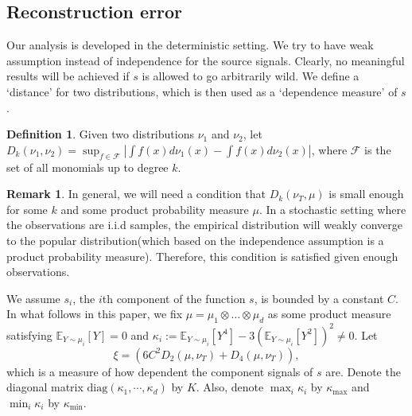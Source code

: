 \documentclass[twoside]{article}
\newcommand{\E}{\mathbb{E}}
\theoremstyle{definition}
\newtheorem{definition}[lemma]{Definition}
\newtheorem{remark}[lemma]{Remark}
\begin{document}
\subsection{Reconstruction error}
\label{subsec:errorHK}
Our analysis is developed in the deterministic setting.
We try to have weak assumption instead of independence for the source signals. 
Clearly, no meaningful results will be achieved if $s$ is allowed to go arbitrarily wild. 
We define a `distance' for two distributions, which is then used as a `dependence measure' of $s$. 
\begin{definition}
Given two distributions $\nu_1$ and $\nu_2$, let $D_k(\nu_1,\nu_2) = \sup_{f\in\mathcal{F}} |\int f(x)d\nu_1(x) - \int f(x)d\nu_2(x)|$, where $\mathcal{F}$ is the set of all monomials up to degree $k$.
\end{definition} 
\begin{remark}
In general, we will need a condition that $D_k(\nu_{T}, \mu)$ is small enough for some $k$ and some product probability measure $\mu$.
In a stochastic setting where the observations are i.i.d samples, the empirical distribution will weakly converge to the popular distribution(which based on the independence assumption is a product probability measure). 
Therefore, this condition is satisfied given enough observations.
\end{remark} 

We assume $s_i$, the $i$th component of the function $s$, is bounded by a constant $C$. 
In what follows in this paper, we fix $\mu = \mu_1\otimes \ldots \otimes \mu_d$ as some product measure
satisfying $\E_{Y\sim\mu_i}[Y]=0$ and $\kappa_i := \E_{Y\sim \mu_i}[Y^4] - 3\left(\E_{Y\sim \mu_i}[Y^2]\right)^2\neq 0$.
Let 
\[
\xi = \left( 6C^2D_2(\mu, \nu_T) + D_4(\mu, \nu_T)\right),
\]
which is a measure of how dependent the  component signals of $s$ are.
Denote the diagonal matrix $\text{diag}(\kappa_1,\cdots,\kappa_d)$ by $K$. 
Also, denote $\max_{i} \kappa_i$ by $\kappa_{\max}$ and $\min_{i} \kappa_i$ by $\kappa_{\min}$.
\end{document}
